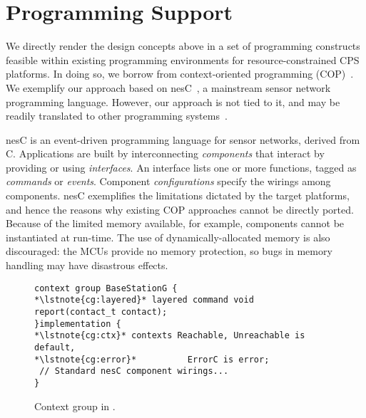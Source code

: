 \section{Programming Support}
\label{sec:conesc}

We directly render the design concepts above in a set of programming
constructs feasible within existing programming environments for
resource-constrained CPS platforms. In doing so, we borrow from
context-oriented programming (COP)~\cite{}. We exemplify our approach
based on nesC~\cite{}, a mainstream sensor network programming
language. However, our approach is not tied to it, and may be readily
translated to other programming systems~\cite{programmingsurvey}.

 nesC is an event-driven programming language
for sensor networks, derived from C. Applications are built by
interconnecting \emph{components} that interact by providing or using
\emph{interfaces}. An interface lists one or more functions, tagged as
\emph{commands} or \emph{events}. %
Component \emph{configurations} specify the wirings among
components. %
nesC exemplifies the limitations dictated by the target platforms, and
hence the reasons why existing COP approaches cannot be directly
ported. Because of the limited memory available, for
example, components cannot be instantiated at run-time. %
The use of dynamically-allocated memory is also discouraged: the MCUs
provide no memory protection, so bugs in memory handling may have
disastrous effects.

\begin{figure}[!tb]
\begin{lstlisting}[style=conescframe]
context group BaseStationG {
*\lstnote{cg:layered}* layered command void report(contact_t contact);
}implementation {
*\lstnote{cg:ctx}* contexts Reachable, Unreachable is default,
*\lstnote{cg:error}*          ErrorC is error;
 // Standard nesC component wirings...
}
\end{lstlisting}
\vspace{-4mm}
\caption{Context group in \conesc.}
  \label{fig:configuration}
\vspace{-2mm}
\end{figure}

